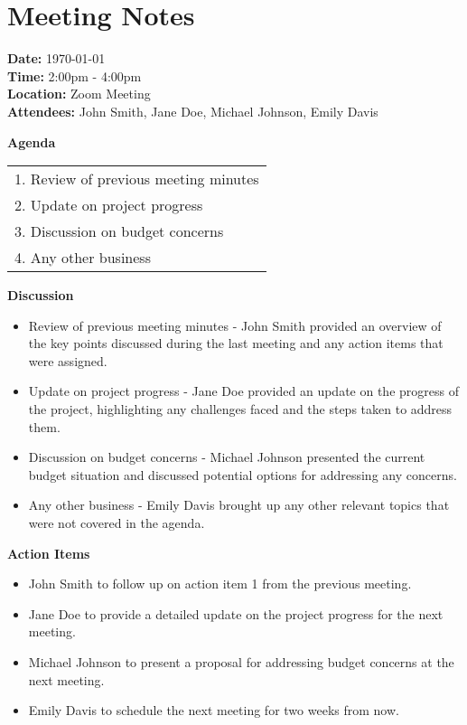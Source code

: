 \documentclass{article}
\begin{document}
\section*{Meeting Notes}

\textbf{Date:} \today \\
\textbf{Time:} 2:00pm - 4:00pm \\
\textbf{Location:} Zoom Meeting \\
\textbf{Attendees:} John Smith, Jane Doe, Michael Johnson, Emily Davis \\

\bigskip

\textbf{Agenda}

\begin{tabularx}{\textwidth}{X}
\toprule
1. Review of previous meeting minutes \\
2. Update on project progress \\
3. Discussion on budget concerns \\
4. Any other business \\
\bottomrule
\end{tabularx}

\bigskip

\textbf{Discussion}

\begin{itemize}
    \item Review of previous meeting minutes - John Smith provided an overview of the key points discussed during the last meeting and any action items that were assigned.
    \item Update on project progress - Jane Doe provided an update on the progress of the project, highlighting any challenges faced and the steps taken to address them.
    \item Discussion on budget concerns - Michael Johnson presented the current budget situation and discussed potential options for addressing any concerns.
    \item Any other business - Emily Davis brought up any other relevant topics that were not covered in the agenda.
\end{itemize}

\textbf{Action Items}

\begin{itemize}
    \item John Smith to follow up on action item 1 from the previous meeting.
    \item Jane Doe to provide a detailed update on the project progress for the next meeting.
    \item Michael Johnson to present a proposal for addressing budget concerns at the next meeting.
    \item Emily Davis to schedule the next meeting for two weeks from now.
\end{itemize}
\end{document}
